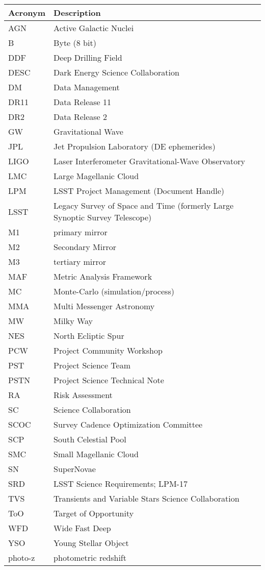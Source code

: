 \addtocounter{table}{-1}
\begin{longtable}{p{}p{}}\hline
\textbf{Acronym} & \textbf{Description}  \\\hline

AGN & Active Galactic Nuclei \\\hline
B & Byte (8 bit) \\\hline
DDF & Deep Drilling Field \\\hline
DESC & Dark Energy Science Collaboration \\\hline
DM & Data Management \\\hline
DR11 & Data Release 11 \\\hline
DR2 & Data Release 2 \\\hline
GW & Gravitational Wave \\\hline
JPL & Jet Propulsion Laboratory (DE ephemerides) \\\hline
LIGO & Laser Interferometer Gravitational-Wave Observatory \\\hline
LMC & Large Magellanic Cloud \\\hline
LPM & LSST Project Management (Document Handle) \\\hline
LSST & Legacy Survey of Space and Time (formerly Large Synoptic Survey Telescope) \\\hline
M1 & primary mirror \\\hline
M2 & Secondary Mirror \\\hline
M3 & tertiary mirror \\\hline
MAF & Metric Analysis Framework \\\hline
MC & Monte-Carlo (simulation/process) \\\hline
MMA & Multi Messenger Astronomy \\\hline
MW & Milky Way \\\hline
NES & North Ecliptic Spur \\\hline
PCW & Project Community Workshop \\\hline
PST & Project Science Team \\\hline
PSTN & Project Science Technical Note \\\hline
RA & Risk Assessment \\\hline
SC & Science Collaboration \\\hline
SCOC & Survey Cadence Optimization Committee \\\hline
SCP & South Celestial Pool \\\hline
SMC & Small Magellanic Cloud \\\hline
SN & SuperNovae \\\hline
SRD & LSST Science Requirements; LPM-17 \\\hline
TVS & Transients and Variable Stars Science Collaboration \\\hline
ToO & Target of Opportunity \\\hline
WFD & Wide Fast Deep \\\hline
YSO & Young Stellar Object \\\hline
photo-z & photometric redshift \\\hline
\end{longtable}
